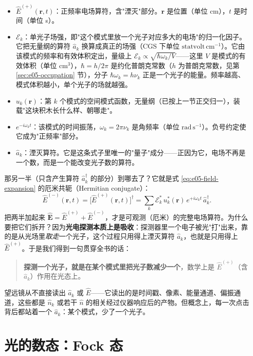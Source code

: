 \begin{itemize}
  \item \(\hat E^{(+)}(\bm r,t)\)：正频率电场算符，含"湮灭"部分。\(\bm r\) 是位置（单位 cm），\(t\) 是时间（单位 s）。
  \item \(\mathcal E_k\)：单光子场强，即"这个模式里放一个光子对应多大的电场"的归一化因子。它把无量纲的算符 \(\hat a_k\) 换算成真正的场强（CGS 下单位 \(\mathrm{statvolt\,cm^{-1}}\)）。它由该模式的频率和有效体积定出，量级上 \(\mathcal E_k\propto\sqrt{\hbar\omega_k/V}\)——这里 \(V\) 是模式的有效体积（单位 cm\(^3\)），\(\hbar=h/2\pi\) 是约化普朗克常数（\(h\) 为普朗克常数，见第 \ref{sec:e05-occupation} 节），分子 \(\hbar\omega_k=h\nu_k\) 正是一个光子的能量。频率越高、模式体积越小，单个光子的场就越强。
  \item \(u_k(\bm r)\)：第 \(k\) 个模式的空间模式函数，无量纲（已按上一节正交归一），装载"这块积木长什么样、朝哪走"。
  \item \(e^{-i\omega_k t}\)：该模式的时间振荡，\(\omega_k=2\pi\nu_k\) 是角频率（单位 \(\mathrm{rad\,s^{-1}}\)）。负号约定使它成为"正频率"部分。
  \item \(\hat a_k\)：湮灭算符。它是这条式子里唯一的"量子"成分——正因为它，电场不再是一个数，而是一个能改变光子数的算符。
\end{itemize}

那另一半（只含产生算符 \(\hat a_k^\dagger\) 的部分）到哪去了？它就是式 \eqref{eq:e05-field-expansion} 的厄米共轭（Hermitian conjugate）：
\[
  \hat E^{(-)}(\bm r,t)=\big[\hat E^{(+)}(\bm r,t)\big]^\dagger
  =\sum_k \mathcal E_k^*\,u_k^*(\bm r)\,e^{+i\omega_k t}\,\hat a_k^\dagger .
\]
把两半加起来 \(\hat{\bm E}=\hat E^{(+)}+\hat E^{(-)}\)，才是可观测（厄米）的完整电场算符。为什么要把它们拆开？因为\textbf{光电探测本质上是吸收}：探测器里一个电子被光"打"出来，靠的是从光场里\emph{取走}一个光子，这个过程只用得上湮灭算符 \(\hat a_k\)，也就是只用得上 \(\hat E^{(+)}\)。于是我们得到一句贯穿全书的话：

\begin{quote}
\textbf{探测一个光子，就是在某个模式里把光子数减少一个}，数学上是 \(\hat E^{(+)}\)（含 \(\hat a_k\)）作用在光态上。
\end{quote}

望远镜从不直接读出 \(\hat a_k\) 或 \(\hat E\)——它读出的是时间戳、像素、能量通道、偏振通道，这些都是 \(\hat n_k\) 或若干 \(\hat n\) 的相关经过仪器响应后的产物。但概念上，每一次点击背后都站着一个 \(\hat a_k\)：某个模式，少了一个光子。

\section{光的数态：Fock 态}
\label{sec:e05-fock}

